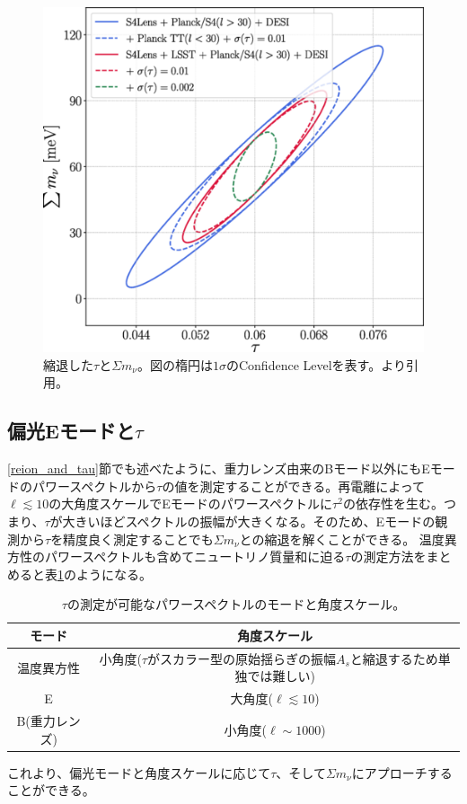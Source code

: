 \begin{figure}[htbp]
  \centering
  \includegraphics[width=0.75\columnwidth]{2_cosmology/figs/medium.png}
  \caption{縮退した$\tau$と$\Sigma m_{\nu}$。図の楕円は$1\sigma$のConfidence Levelを表す。\cite{degeneracy}より引用。}
  \label{degeneracy}
\end{figure}

\subsection{偏光Eモードと$\tau$}
\label{E_and_tau}
\ref{reion_and_tau}節でも述べたように、重力レンズ由来のBモード以外にもEモードのパワースペクトルから$\tau$の値を測定することができる。再電離によって$\ell\lesssim 10$の大角度スケールでEモードのパワースペクトルに$\tau^{2}$の依存性を生む。つまり、$\tau$が大きいほどスペクトルの振幅が大きくなる。そのため、Eモードの観測から$\tau$を精度良く測定することでも$\Sigma m_{\nu}$との縮退を解くことができる。
温度異方性のパワースペクトルも含めてニュートリノ質量和に迫る$\tau$の測定方法をまとめると表\ref{tau_methods}のようになる。
\begin{table}[htbp]
  \centering
  \caption{$\tau$の測定が可能なパワースペクトルのモードと角度スケール。}
  \vspace{3mm}
  \begin{tabular}{cc} \hline\hline
    モード & 角度スケール  \\ \hline
    温度異方性 & 小角度($\tau$がスカラー型の原始揺らぎの振幅$A_{s}$と縮退するため単独では難しい) \\
    E & 大角度($\ell\lesssim 10$) \\
    B(重力レンズ) & 小角度($\ell\sim 1000$) \\ \hline\hline
  \end{tabular}
  \label{tau_methods}
\end{table}
これより、偏光モードと角度スケールに応じて$\tau$、そして$\Sigma m_{\nu}$にアプローチすることができる。

